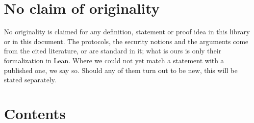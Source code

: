 \section*{No claim of originality}

No originality is claimed for any definition, statement or proof idea in this library or in this
document. The protocols, the security notions and the arguments come from the cited literature, or
are standard in it; what is ours is only their formalization in Lean. Where we could not yet match a
statement with a published one, we say so. Should any of them turn out to be new, this will be
stated separately.

\section*{Contents}

